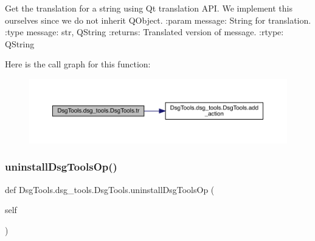 \begin{DoxyVerb}Get the translation for a string using Qt translation API.
We implement this ourselves since we do not inherit QObject.
:param message: String for translation.
:type message: str, QString
:returns: Translated version of message.
:rtype: QString
\end{DoxyVerb}
 Here is the call graph for this function\+:
\nopagebreak
\begin{figure}[H]
\begin{center}
\leavevmode
\includegraphics[width=350pt]{class_dsg_tools_1_1dsg__tools_1_1_dsg_tools_aeeb684b5ae66c23eb45ccffefb6c0485_cgraph}
\end{center}
\end{figure}
\mbox{\label{class_dsg_tools_1_1dsg__tools_1_1_dsg_tools_a3110b80e4009faa9ca49631bc96147eb}} 
\subsubsection{\texorpdfstring{uninstall\+Dsg\+Tools\+Op()}{uninstallDsgToolsOp()}}
{\footnotesize\ttfamily def Dsg\+Tools.\+dsg\+\_\+tools.\+Dsg\+Tools.\+uninstall\+Dsg\+Tools\+Op (\begin{DoxyParamCaption}\item[{}]{self }\end{DoxyParamCaption})}

